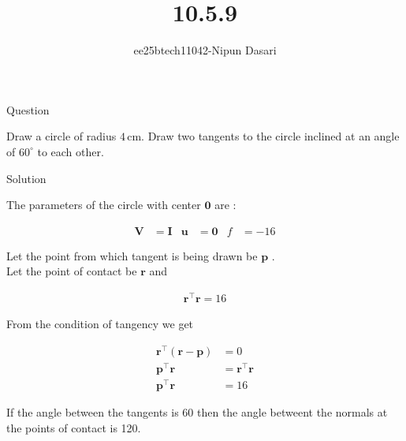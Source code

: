 \documentclass{beamer}
\title{10.5.9}
\author{ee25btech11042-Nipun Dasari}
\numberwithin{equation}{section}
\theoremstyle{remark}
\let\vec\mathbf
\begin{document}
	
	\begin{frame}
		\titlepage
	\end{frame}
	
	\begin{frame}{Question}
		
		Draw a circle of radius $4\,$cm. Draw two tangents to the circle inclined at an angle of $60^\circ$ to each other.
		
	\end{frame}
	

	
	\begin{frame}{Solution}
		
		The parameters of the circle with center $\vec{0}$ are :
		
		\begin{align}
			\vec{V} &= \vec{I} & \vec{u} &= \vec{0} & f &= -16
		\end{align}
		
		Let the point from which tangent is being drawn be $\vec{p}$ .\\
		
		Let the point of contact be $\vec{r}$ and 
		
		\begin{align}
			\vec{r}^\top\vec{r} = 16 
		\end{align}
		
		From the condition of tangency we get 
		
		\begin{align}
			\vec{r}^\top(\vec{r}-\vec{p}) &= 0\\
			\vec{p}^\top\vec{r} &= \vec{r}^\top\vec{r}\\
			\vec{p}^\top\vec{r} &= 16 \label{eq:pr} 
		\end{align}
		
		If the angle between the tangents is 60{\degree} then the angle betweent the normals at the points of contact is 120{\degree}.\\
		
		
	\end{frame}
	
\end{document}
